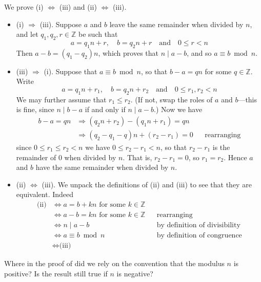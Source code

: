 \begin{cproof}
We prove (i) $\Leftrightarrow$ (iii) and (ii) $\Leftrightarrow$ (iii).
\begin{itemize}
\item (i) $\Rightarrow$ (iii). Suppose $a$ and $b$ leave the same remainder when divided by $n$, and let $q_1,q_2,r \in \mathbb{Z}$ be such that
\[ a=q_1n+r, \quad b = q_2n+r \quad \text{and} \quad 0 \le r < n \]
Then $a-b = (q_1-q_2)n$, which proves that $n \mid a-b$, and so $a \equiv b \bmod n$.
\item (iii) $\Rightarrow$ (i). Suppose that $a \equiv b \bmod n$, so that $b-a = qn$ for some $q \in \mathbb{Z}$. Write
\[ a=q_1n+r_1, \quad b = q_2n+r_2 \quad \text{and} \quad 0 \le r_1,r_2 < n \]
We may further assume that $r_1 \le r_2$. (If not, swap the roles of $a$ and $b$---this is fine, since $n \mid b-a$ if and only if $n \mid a-b$.) Now we have
\begin{align*}
b-a = qn & \Rightarrow (q_2n+r_2) - (q_1n+r_1) = qn && \\
& \Rightarrow (q_2-q_1-q)n + (r_2-r_1) = 0 && \text{rearranging}
\end{align*}
since $0 \le r_1 \le r_2 < n$ we have $0 \le r_2-r_1 < n$, so that $r_2-r_1$ is the remainder of $0$ when divided by $n$. That is, $r_2-r_1=0$, so $r_1=r_2$. Hence $a$ and $b$ have the same remainder when divided by $n$.
\item (ii) $\Leftrightarrow$ (iii). We unpack the definitions of (ii) and (iii) to see that they are equivalent. Indeed
\begin{align*}
\text{(ii)} &\Leftrightarrow a=b+kn \text{ for some $k \in \mathbb{Z}$} && \\
&\Leftrightarrow a-b=kn \text{ for some $k \in \mathbb{Z}$} && \text{rearranging} \\
&\Leftrightarrow n \mid a-b && \text{by definition of divisibility} \\
&\Leftrightarrow a \equiv b \bmod n && \text{by definition of congruence} \\
&\Leftrightarrow \text{(iii)} &&
\end{align*}
\end{itemize}
\end{cproof}

\begin{discussion}
Where in the proof of  did we rely on the convention that the modulus $n$ is positive? Is the result still true if $n$ is negative?
\end{discussion}

